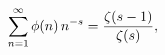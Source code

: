 \[\sum_{n=1}^{\infty}\mathop{\phi\/}\nolimits\!\left(n\right)n^{-s}=\frac{%
\mathop{\zeta\/}\nolimits\!\left(s-1\right)}{\mathop{\zeta\/}\nolimits\!\left(%
s\right)},\]